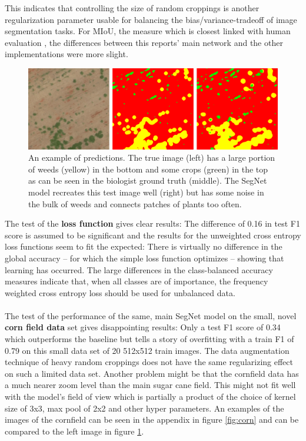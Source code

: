 \documentclass{article}
\begin{document}
This indicates that controlling the size of random croppings is another regularization parameter usable for balancing the bias/variance-tradeoff of image segmentation tasks. For MIoU, the measure which is closest linked with human evaluation \cite{eval}, the differences between this reports' main network and the other implementations were more slight. 
\begin{figure}[h!]
	\centering
	\includegraphics[width=\linewidth]{../../poster/reconst}
	\caption{An example of predictions. The true image (left) has a large portion of weeds (yellow) in the bottom and some crops (green) in the top as can be seen in the biologist ground truth (middle). The SegNet model recreates this test image well (right) but has some noise in the bulk of weeds and connects patches of plants too often. }
	\label{fig:reconst}
\end{figure}

\noindent
The test of the \textbf{loss function} gives clear results: The difference of 0.16 in test F1 score is assumed to be significant and the results for the unweighted cross entropy loss functions seem to fit the expected:
There is virtually no difference in the global accuracy -- for which the simple loss function optimizes -- showing that learning has occurred.
The large differences in the class-balanced accuracy measures indicate that, when all classes are of importance, the frequency weighted cross entropy loss should be used  for unbalanced data.
\\
\\
The test of the performance of the same, main SegNet model on the small, novel \textbf{corn field data} set gives disappointing results: Only a test F1 score of 0.34 which outperforms the baseline but tells a story of overfitting with a train F1 of 0.79 on this small data set of 20 512x512 train images.
 The data augmentation technique of heavy random croppings does not have the same regularizing effect on such a limited data set. 
Another problem might be that the cornfield data has a much nearer zoom level than the main sugar cane field.
This might not fit well with the model's field of view which is partially a product of the choice of kernel size of 3x3, max pool of 2x2 and other hyper parameters. An examples of the images of the cornfield can be seen in the appendix in figure \ref{fig:corn} and can be compared to the left image in figure \ref{fig:reconst}.
\end{document}
